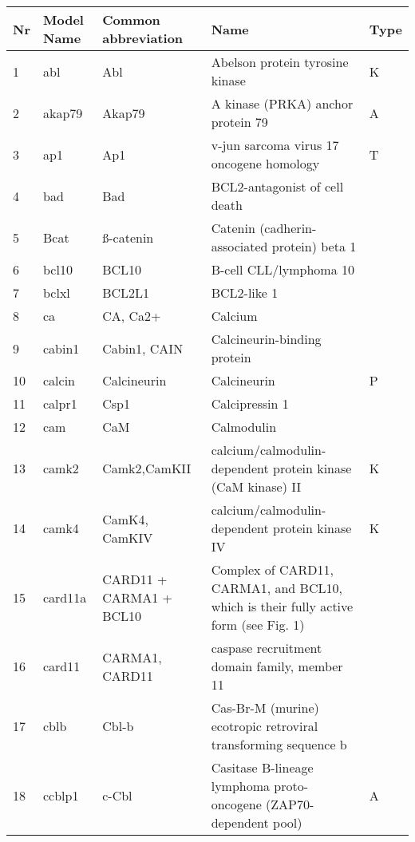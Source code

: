 \documentclass[a4paper, 12pt,epsfig, onecolumn]{article}
\begin{document}
{\begin{longtable}{|p{}|p{}|p{}|p{}|p{}|}
\hline
  {\bf Nr} & {\bf Model Name} & {\bf Common \phantom{  } {abbreviation}} & {\bf Name} &{\bf Type} \\ \endhead 
\hline
         1 &  abl       &        Abl & Abelson protein tyrosine kinase &         K  \\
\hline
         2 &   akap79   &     Akap79 & A kinase (PRKA) anchor protein 79 &         A  \\
\hline
         3 &  ap1       &       Ap1  & v-jun sarcoma virus 17 oncogene homology &         T  \\
\hline
         4 &  bad       &        Bad & BCL2-antagonist of cell death  &            \\
\hline
         5 &    Bcat    &  ß-catenin & Catenin (cadherin-associated protein) beta 1 &            \\
\hline
         6 &   bcl10    &      BCL10 & B-cell CLL/lymphoma 10  &            \\
\hline
         7 &  bclxl     &     BCL2L1 & BCL2-like 1 &            \\
\hline
         8 &  ca        &   CA, Ca2+ &    Calcium &            \\
\hline
         9 &    cabin1  & Cabin1, CAIN & Calcineurin-binding protein &            \\
\hline
        10 &  calcin    & Calcineurin & Calcineurin &          P \\
\hline
        11 &  calpr1    &       Csp1 & Calcipressin 1 &            \\
\hline
        12 &   cam      &       CaM  & Calmodulin &            \\
\hline
        13 &   camk2    & Camk2,CamKII & calcium/calmodulin-dependent protein kinase (CaM kinase) II  &         K  \\
\hline
        14 &  camk4     & CamK4, CamKIV & calcium/calmodulin-dependent protein kinase IV &         K  \\
\hline
        15 &  card11a   & CARD11 + CARMA1 + BCL10 & Complex of CARD11, CARMA1, and BCL10, which is their fully active form (see Fig. 1) &            \\
\hline
        16 &    card11  & CARMA1, CARD11 & caspase recruitment domain family, member 11    &            \\
\hline
        17 &   cblb     &      Cbl-b & Cas-Br-M (murine) ecotropic retroviral transforming sequence b &            \\
\hline
        18 &     ccblp1 &     c-Cbl  & Casitase B-lineage lymphoma proto-oncogene (ZAP70-dependent pool) &         A  \\

\end{longtable}}
\end{document}
